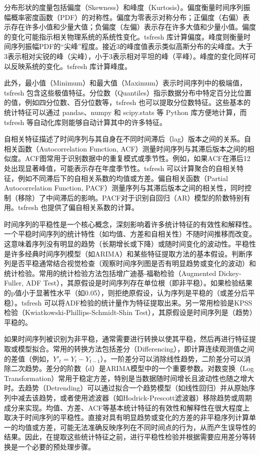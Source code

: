             分布形状的度量包括偏度（Skewness）和峰度（Kurtosis）。偏度衡量时间序列振幅概率密度函数（PDF）的对称性。偏度为零表示对称分布；正偏度（右偏）表示存在许多小值和少量大值；负偏度（左偏）表示存在许多大值和少量小值。偏度的变化可能指示相关物理系统的系统性变化。tsfresh 库计算偏度。峰度则衡量时间序列振幅PDF的“尖峰”程度。接近3的峰度值表示类似高斯分布的尖峰度。大于3表示相对尖锐的峰（尖峰），小于3表示相对平坦的峰（平峰）。峰度的变化同样可以反映系统的变化。tsfresh 库计算峰度。

            此外，最小值（Minimum）和最大值（Maximum）表示时间序列中的极端值，tsfresh 包含这些极值特征。分位数（Quantiles）指示数据分布中特定百分比位置的值，例如四分位数、百分位数等，tsfresh 也可以提取分位数特征。这些基本的统计特征可以通过 pandas、numpy 和 scipy.stats 等 Python 库方便地计算，而 tsfresh 等自动化库则能够自动计算其中的许多特征。

            自相关特征描述了时间序列与其自身在不同时间滞后（lag）版本之间的关系。自相关函数（Autocorrelation Function, ACF）测量时间序列与其滞后版本之间的相似度。ACF图常用于识别数据中的重复模式或季节性。例如，如果ACF在滞后12处出现显著峰值，可能表示存在年度季节性。tsfresh 可以计算聚合的自相关特征，例如不同滞后下的自相关系数的均值或方差。偏自相关函数（Partial Autocorrelation Function, PACF）测量序列与其滞后版本之间的相关性，同时控制（移除）了中间滞后的影响。PACF对于识别自回归（AR）模型的阶数特别有用。tsfresh 也提供了偏自相关系数的计算。

            时间序列的平稳性是一个核心概念，深刻影响着许多统计特征的有效性和解释性。一个平稳时间序列的统计特性（如均值、方差和自相关性）不随时间推移而改变。这意味着序列没有明显的趋势（长期增长或下降）或随时间变化的波动性。平稳性是许多经典时间序列模型（如ARIMA）和某些特征提取方法的基本假设。判断序列是否平稳通常结合视觉检查（观察时间序列图是否有明显趋势或变化的波动）和统计检验。常用的统计检验方法包括增广迪基-福勒检验（Augmented Dickey-Fuller, ADF Test），其原假设是时间序列存在单位根（即非平稳）。如果检验结果的p值小于显著性水平（如0.05），则拒绝原假设，认为序列是平稳的（或差分后平稳）。tsfresh 可以将ADF检验的统计量作为特征提取出来。另一常用检验是KPSS检验（Kwiatkowski-Phillips-Schmidt-Shin Test），其原假设是时间序列是（趋势）平稳的。

            如果时间序列被识别为非平稳，通常需要进行转换以使其平稳，然后再进行特征提取或模型拟合。常用的转换方法包括差分（Differencing），即计算连续观测值之间的差值（例如，$Y'_t = Y_t - Y_{t-1}$）。一阶差分可以消除线性趋势，二阶差分可以消除二次趋势。差分的阶数（d）是ARIMA模型中的一个重要参数。对数变换（Log Transformation）常用于稳定方差，特别是当数据随时间增长且波动性也随之增大时。去趋势（Detrending）可以通过拟合一个趋势模型（如线性回归）并从原始序列中减去该趋势，或者使用滤波器（如Hodrick-Prescott滤波器）移除趋势或周期成分来实现。均值、方差、ACF等基本统计特征的有效性和解释性在很大程度上取决于时间序列的平稳性。直接对具有明显趋势或变化的方差的非平稳序列计算单一的均值或方差，可能无法准确反映序列在不同时间点的行为，从而产生误导性的结果。因此，在提取这些统计特征之前，进行平稳性检验并根据需要应用差分等转换是一个必要的预处理步骤。

